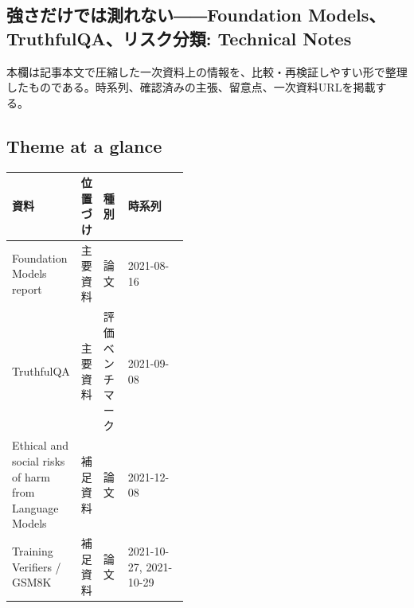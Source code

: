 \subsection*{強さだけでは測れない――Foundation Models、TruthfulQA、リスク分類: Technical Notes}
本欄は記事本文で圧縮した一次資料上の情報を、比較・再検証しやすい形で整理したものである。時系列、確認済みの主張、留意点、一次資料URLを掲載する。
\smallskip
{}\par
\medskip
\subsection*{Theme at a glance}
\begin{center}
\footnotesize
\begin{tabularx}{\linewidth}{@{}p{0.20\linewidth}p{0.10\linewidth}p{0.14\linewidth}X@{}}
\toprule
資料 & 位置づけ & 種別 & 時系列 \\
\midrule
Foundation Models report & 主要資料 & 論文 & 2021-08-16 \\
TruthfulQA & 主要資料 & 評価ベンチマーク & 2021-09-08 \\
Ethical and social risks of harm from Language Models & 補足資料 & 論文 & 2021-12-08 \\
Training Verifiers / GSM8K & 補足資料 & 論文 & 2021-10-27, 2021-10-29 \\
\bottomrule
\end{tabularx}
\end{center}
\normalsize

